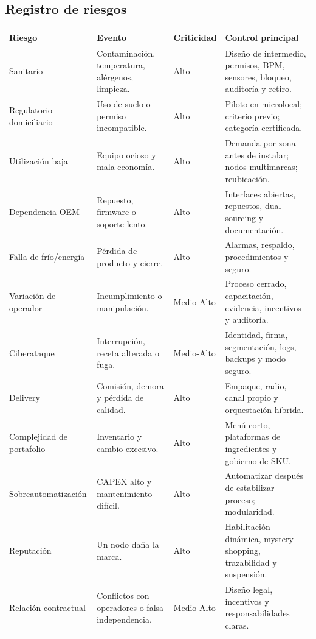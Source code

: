 \documentclass[11pt,a4paper]{article}
\begin{document}
\subsection{Registro de riesgos}
{\small
\begin{xltabular}{\textwidth}{@{}P{3.3cm}LP{1.8cm}L@{}}
\toprule
\textbf{Riesgo} & \textbf{Evento} & \textbf{Criticidad} & \textbf{Control principal}\\ \midrule
\endhead
Sanitario & Contaminación, temperatura, alérgenos, limpieza. & Alto & Diseño de intermedio, permisos, BPM, sensores, bloqueo, auditoría y retiro.\\
Regulatorio domiciliario & Uso de suelo o permiso incompatible. & Alto & Piloto en microlocal; criterio previo; categoría certificada.\\
Utilización baja & Equipo ocioso y mala economía. & Alto & Demanda por zona antes de instalar; nodos multimarcas; reubicación.\\
Dependencia OEM & Repuesto, firmware o soporte lento. & Alto & Interfaces abiertas, repuestos, dual sourcing y documentación.\\
Falla de frío/energía & Pérdida de producto y cierre. & Alto & Alarmas, respaldo, procedimientos y seguro.\\
Variación de operador & Incumplimiento o manipulación. & Medio-Alto & Proceso cerrado, capacitación, evidencia, incentivos y auditoría.\\
Ciberataque & Interrupción, receta alterada o fuga. & Medio-Alto & Identidad, firma, segmentación, logs, backups y modo seguro.\\
Delivery & Comisión, demora y pérdida de calidad. & Alto & Empaque, radio, canal propio y orquestación híbrida.\\
Complejidad de portafolio & Inventario y cambio excesivo. & Alto & Menú corto, plataformas de ingredientes y gobierno de SKU.\\
Sobreautomatización & CAPEX alto y mantenimiento difícil. & Alto & Automatizar después de estabilizar proceso; modularidad.\\
Reputación & Un nodo daña la marca. & Alto & Habilitación dinámica, mystery shopping, trazabilidad y suspensión.\\
Relación contractual & Conflictos con operadores o falsa independencia. & Medio-Alto & Diseño legal, incentivos y responsabilidades claras.\\
\bottomrule
\end{xltabular}}
\end{document}

